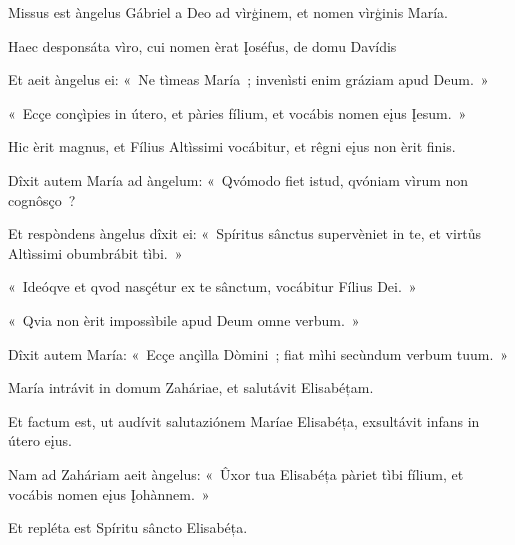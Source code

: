 
Missus est àngelus Gábriel a Deo ad vìrģinem, et nomen vìrģinis María. 

Haec desponsáta vìro, cui nomen èrat Įoséfus, de domu Davídis 

Et aeit àngelus ei: «~Ne tìmeas María~; invenìsti enim gráziam apud Deum.~» 

«~Ecçe conçìpies in útero, et pàries fílium, et vocábis nomen eįus Įesum.~» 

Hic èrit magnus, et Fílius Altìssimi vocábitur, et rêgni eįus non èrit finis. 

Dîxit autem María ad àngelum: «~Qvómodo fiet istud, qvóniam vìrum non cognôsço~? 

Et respòndens àngelus dîxit ei: «~Spíritus sânctus supervèniet in te, et virtůs Altìssimi obumbrábit tìbi.~» 

«~Ideóqve et qvod nasçétur ex te sânctum, vocábitur Fílius Dei.~» 

«~Qvia non èrit impossìbile apud Deum omne verbum.~» 

Dîxit autem María: «~Ecçe ançìlla Dòmini~; fiat mìhi secùndum verbum tuum.~» 


María intrávit in domum Zaháriae, et salutávit Elisabéțam. 

Et factum est, ut audívit salutaziónem Maríae Elisabéța, exsultávit infans in útero eįus. 

Nam ad Zaháriam aeit àngelus: «~Ûxor tua Elisabéța pàriet tìbi fílium, et vocábis nomen eįus Įohànnem.~» 

Et repléta est Spíritu sâncto Elisabéța. 

